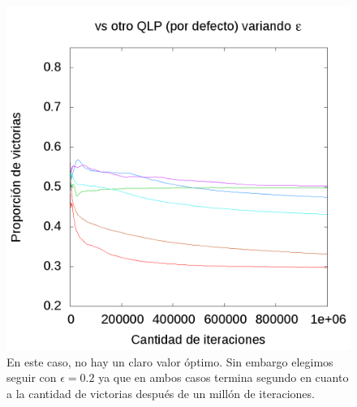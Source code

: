 \documentclass[10pt, a4paper]{article}
\begin{document}
\begin{figure}[H]
\begin{minipage}[c]{1\textwidth}
	\includegraphics[scale=0.2]{EpsilonQ.png}
	\caption{En este caso, no  hay un claro valor óptimo. Sin embargo elegimos seguir con $\epsilon=0.2$ ya que en ambos casos termina segundo en cuanto a la cantidad de victorias después de un millón de iteraciones.}
  \end{minipage}
\end{figure}
\end{document}

